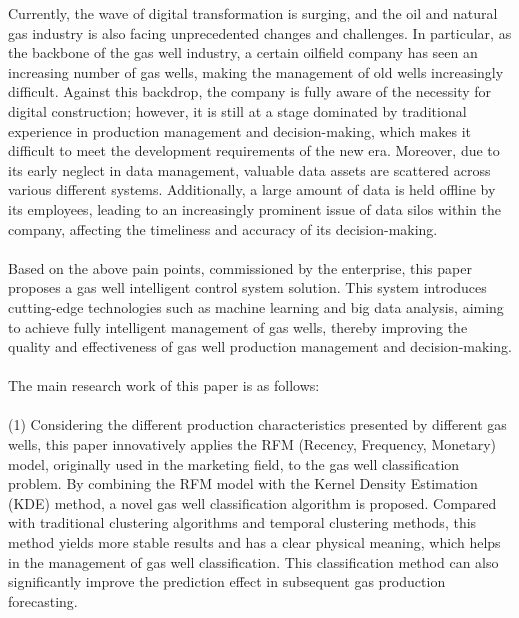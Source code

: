 \begin{englishabstract}
    Currently, the wave of digital transformation is surging, and the oil and natural gas industry is also facing unprecedented changes and challenges. In particular, as the backbone of the gas well industry, a certain oilfield company has seen an increasing number of gas wells, making the management of old wells increasingly difficult. Against this backdrop, the company is fully aware of the necessity for digital construction; however, it is still at a stage dominated by traditional experience in production management and decision-making, which makes it difficult to meet the development requirements of the new era. Moreover, due to its early neglect in data management, valuable data assets are scattered across various different systems. Additionally, a large amount of data is held offline by its employees, leading to an increasingly prominent issue of data silos within the company, affecting the timeliness and accuracy of its decision-making.
    \\~\\
    Based on the above pain points, commissioned by the enterprise, this paper proposes a gas well intelligent control system solution. This system introduces cutting-edge technologies such as machine learning and big data analysis, aiming to achieve fully intelligent management of gas wells, thereby improving the quality and effectiveness of gas well production management and decision-making.
    \\~\\
    The main research work of this paper is as follows:
    \\~\\
    (1) Considering the different production characteristics presented by different gas wells, this paper innovatively applies the RFM (Recency, Frequency, Monetary) model, originally used in the marketing field, to the gas well classification problem. By combining the RFM model with the Kernel Density Estimation (KDE) method, a novel gas well classification algorithm is proposed. Compared with traditional clustering algorithms and temporal clustering methods, this method yields more stable results and has a clear physical meaning, which helps in the management of gas well classification. This classification method can also significantly improve the prediction effect in subsequent gas production forecasting.
    \\~\\

\end{englishabstract}
